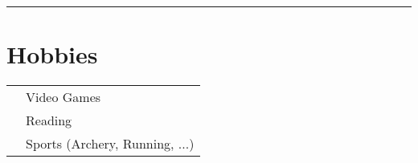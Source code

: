 \documentclass[oneside]{article}
\begin{document}
{\begin{minipage}[t][\textheight-2\fboxsep-2\fboxrule][t]{\dimexpr0.40\textwidth-2\fboxrule-2\fboxsep\relax}
        \rule{\linewidth}{0.4pt}
        \section*{\large Hobbies}
        \begin{tabularx}{\textwidth}{cY}
            \faGamepad{} & Video Games \\
            \faBookReader{} & Reading \\
            \faWalking{} & Sports (Archery, Running, ...) \\
        \end{tabularx}
        \vspace{.3cm}
        
        \vfill
        
        
    \end{minipage}
}
\hfill
\end{document}
